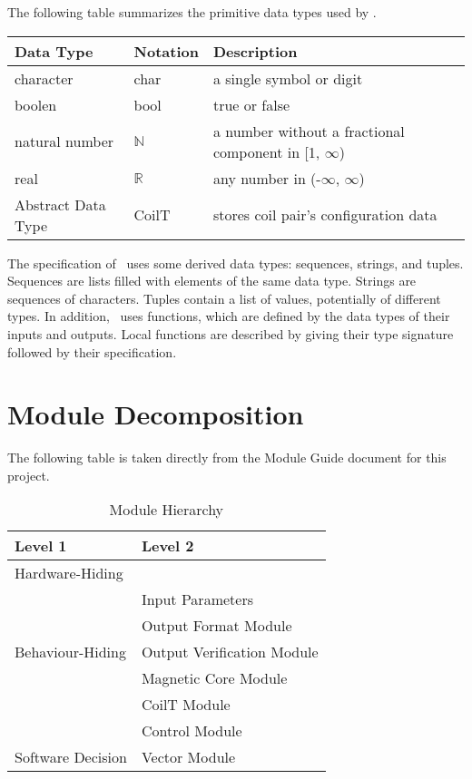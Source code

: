 \documentclass[12pt, titlepage]{article}
\begin{document}
The following table summarizes the primitive data types used by \progname. 

\begin{center}
\renewcommand{\arraystretch}{1.2}
\noindent 
\begin{tabular}{l l p{7.5cm}} 
\toprule 
\textbf{Data Type} & \textbf{Notation} & \textbf{Description}\\ 
\midrule
character & char & a single symbol or digit\\
boolen & bool & true or false \\
natural number & $\mathbb{N}$ & a number without a fractional component in [1, $\infty$) \\
real & $\mathbb{R}$ & any number in (-$\infty$, $\infty$)\\
Abstract Data Type & CoilT & stores coil pair’s configuration data\\
\bottomrule
\end{tabular} 
\end{center}

\noindent
The specification of \progname \ uses some derived data types: sequences, strings, and
tuples. Sequences are lists filled with elements of the same data type. Strings
are sequences of characters. Tuples contain a list of values, potentially of
different types. In addition, \progname \ uses functions, which
are defined by the data types of their inputs and outputs. Local functions are
described by giving their type signature followed by their specification.

\section{Module Decomposition}

The following table is taken directly from the Module Guide document for this project.

\begin{table}[h!]
\centering
\begin{tabular}{p{} p{}}
\toprule
\textbf{Level 1} & \textbf{Level 2}\\
\midrule

{Hardware-Hiding} & ~ \\
\midrule

\multirow{5}{0.3\textwidth}{Behaviour-Hiding} & Input Parameters\\
& Output Format Module\\
& Output Verification Module\\
& Magnetic Core Module\\
& CoilT Module\\
& Control Module\\
\midrule

\multirow{1}{0.3\textwidth}{Software Decision} & Vector Module\\

\bottomrule

\end{tabular}
\caption{Module Hierarchy}
\label{TblMH}
\end{table}
\end{document}
